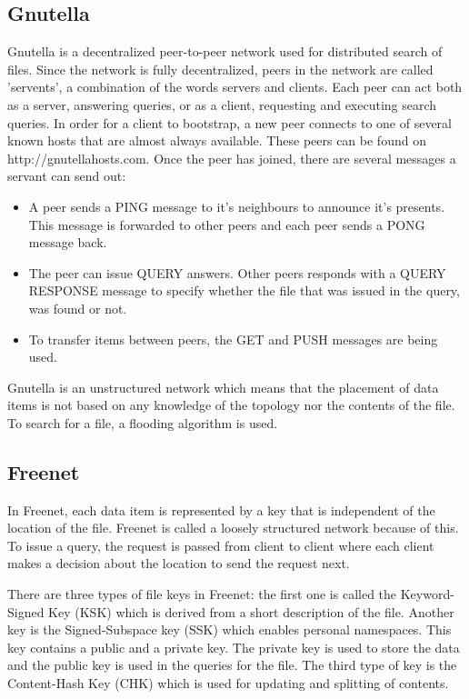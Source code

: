 \documentclass{article}
\begin{document}
	\subsection{Gnutella} %
		Gnutella is a decentralized peer-to-peer network used for distributed search of files. Since the network is fully decentralized, peers in the network are called 'servents', a combination of the words servers and clients. Each peer can act both as a server, answering queries, or as a client, requesting and executing search queries. In order for a client to bootstrap, a new peer connects to one of several known hosts that are almost always available. These peers can be found on http://gnutellahosts.com. Once the peer has joined, there are several messages a servant can send out:
	
		\begin{itemize}
			\item A peer sends a PING message to it's neighbours to announce it's presents. This message is forwarded to other peers and each peer sends a PONG message back.
			\item The peer can issue QUERY answers. Other peers responds with a QUERY RESPONSE message to specify whether the file that was issued in the query, was found or not.
			\item To transfer items between peers, the GET and PUSH messages are being used.
		\end{itemize}
		
		Gnutella is an unstructured network which means that the placement of data items is not based on any knowledge of the topology nor the contents of the file. To search for a file, a flooding algorithm is used.
	
	\subsection{Freenet} %
		In Freenet, each data item is represented by a key that is independent of the location of the file. Freenet is called a loosely structured network because of this. To issue a query, the request is passed from client to client where each client makes a decision about the location to send the request next.
		
		There are three types of file keys in Freenet: the first one is called the Keyword-Signed Key (KSK) which is derived from a short description of the file. Another key is the Signed-Subspace key (SSK) which enables personal namespaces. This key contains a public and a private key. The private key is used to store the data and the public key is used in the queries for the file. The third type of key is the Content-Hash Key (CHK) which is used for updating and splitting of contents.
		
\end{document}
